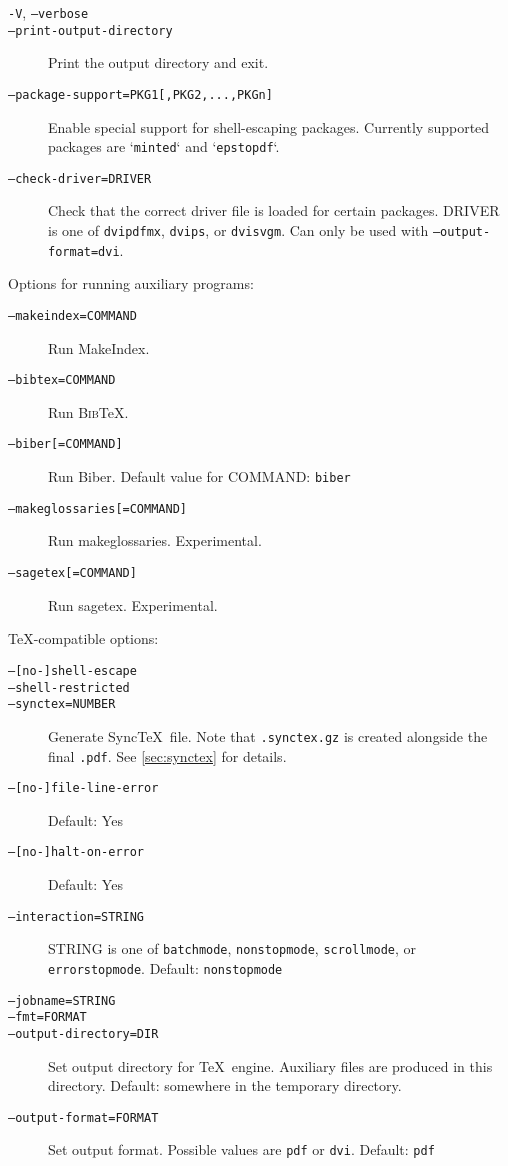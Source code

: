 \documentclass[a4paper]{report}
\providecommand\BibTeX{\textsc{Bib}\TeX}
\newcommand\metavar[1]{\textnormal{\textsf{#1}}}
\begin{document}
\begin{description}
\item[\texttt{-V}, \texttt{--verbose}]
\item[\texttt{--print-output-directory}]
  Print the output directory and exit.
\item[\texttt{--package-support=PKG1[,PKG2,...,PKGn]}]
  Enable special support for shell-escaping packages.
  Currently supported packages are `\texttt{minted}` and `\texttt{epstopdf}`.
\item[\texttt{--check-driver=DRIVER}]
  Check that the correct driver file is loaded for certain packages.
  \metavar{DRIVER} is one of \texttt{dvipdfmx}, \texttt{dvips}, or \texttt{dvisvgm}.
  Can only be used with \texttt{--output-format=dvi}.
\end{description}

Options for running auxiliary programs:
\begin{description}
\item[\texttt{--makeindex=\metavar{COMMAND}}]
  Run MakeIndex.
\item[\texttt{--bibtex=\metavar{COMMAND}}]
  Run \BibTeX.
\item[\texttt{--biber[=\metavar{COMMAND}]}]
  Run Biber. Default value for \metavar{COMMAND}: \texttt{biber}
\item[\texttt{--makeglossaries[=\metavar{COMMAND}]}]
  Run makeglossaries. Experimental.
\item[\texttt{--sagetex[=\metavar{COMMAND}]}]
  Run sagetex. Experimental.
\end{description}

\TeX-compatible options:
\begin{description}
\item[\texttt{--[no-]shell-escape}]
\item[\texttt{--shell-restricted}]
\item[\texttt{--synctex=\metavar{NUMBER}}]
  Generate Sync\TeX\ file.
  Note that \texttt{.synctex.gz} is created alongside the final \texttt{.pdf}.
  See \autoref{sec:synctex} for details.
\item[\texttt{--[no-]file-line-error}]
  Default: Yes
\item[\texttt{--[no-]halt-on-error}]
  Default: Yes
\item[\texttt{--interaction=\metavar{STRING}}]
  \metavar{STRING} is one of \texttt{batchmode}, \texttt{nonstopmode}, \texttt{scrollmode}, or \texttt{errorstopmode}.
  Default: \texttt{nonstopmode}
\item[\texttt{--jobname=\metavar{STRING}}]
\item[\texttt{--fmt=\metavar{FORMAT}}]
\item[\texttt{--output-directory=\metavar{DIR}}]
  Set output directory for \TeX\ engine.
  Auxiliary files are produced in this directory.
  Default: somewhere in the temporary directory.
\item[\texttt{--output-format=\metavar{FORMAT}}]
  Set output format.
  Possible values are \texttt{pdf} or \texttt{dvi}.
  Default: \texttt{pdf}
\end{description}
\end{document}
